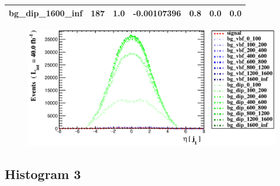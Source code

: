 \documentclass[a4paper, 10pt]{article}
\begin{document}
\begin{table}[H]
\begin{center}
\begin{tabular}{|m{23.0mm}|m{23.0mm}|m{18.0mm}|m{19.0mm}|m{19.0mm}|m{19.0mm}|m{19.0mm}|}
      \hline
      {\cellcolor{white}         bg\_dip\_1600\_inf}& {\cellcolor{white}         187}& {\cellcolor{white}         1.0}& {\cellcolor{white}         -0.00107396}& {\cellcolor{white}         0.8}& {\cellcolor{green}         0.0}& {\cellcolor{green}         0.0}\\
\hline
    \end{tabular}
  \end{center}
\end{table}

\begin{figure}[H]
  \begin{center}
    \includegraphics[scale=0.45]{selection_1.eps}\\
\caption{   }
  \end{center}
\end{figure}
      \newpage
\subsection{ Histogram 3}
\end{document}
